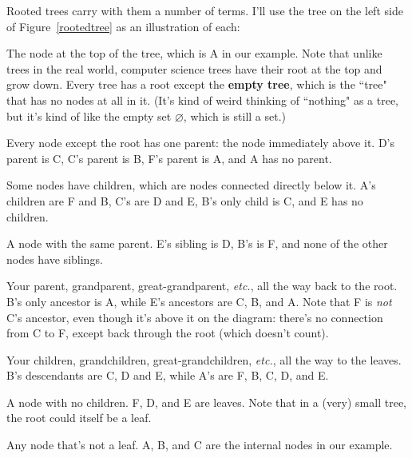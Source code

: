 Rooted trees carry with them a number of terms. I'll use the tree on the
left side of Figure~\ref{rootedtree} as an illustration of each:

\begin{description}
\item[root.] The node at the top of the tree, which is A in our example.
Note that unlike trees in the real world, computer science trees have their
root at the top and grow down. Every tree has a root except the
\textbf{empty tree}, which is the ``tree" that has no nodes at all in it.
(It's kind of weird thinking of ``nothing" as a tree, but it's kind of like
the empty set $\varnothing$, which is still a set.) 

\item[parent.] Every node except the root has one parent: the node
immediately above it. D's parent is C, C's parent is B, F's parent is A,
and A has no parent.

\item[child.] Some nodes have children, which are nodes connected directly
below it. A's children are F and B, C's are D and E, B's only child is C,
and E has no children.

\item[sibling.] A node with the same parent. E's sibling is D, B's is F,
and none of the other nodes have siblings.

\item[ancestor.] Your parent, grandparent, great-grandparent,
\textit{etc.}, all the way back to the root. B's only ancestor is A, while
E's ancestors are C, B, and A. Note that F is \textit{not} C's ancestor,
even though it's above it on the diagram: there's no connection from C to
F, except back through the root (which doesn't count).

\item[descendant.] Your children, grandchildren, great-grandchildren,
\textit{etc.}, all the way to the leaves. B's descendants are C, D and E,
while A's are F, B, C, D, and E. 

\item[leaf.] A node with no children. F, D, and E are leaves. Note that in
a (very) small tree, the root could itself be a leaf.

\item[internal node.] Any node that's not a leaf. A, B, and C are the
internal nodes in our example.


\end{description}
